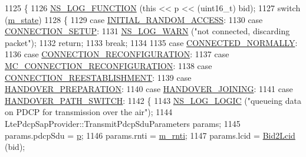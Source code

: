 \begin{DoxyCode}
1125 \{
1126   \hyperlink{log-macros-disabled_8h_a90b90d5bad1f39cb1b64923ea94c0761}{NS\_LOG\_FUNCTION} (\textcolor{keyword}{this} << p << (uint16\_t) bid);
1127   \textcolor{keywordflow}{switch} (\hyperlink{classns3_1_1UeManager_aaed4b2490297cb912e743084f1a27b08}{m\_state})
1128     \{
1129     \textcolor{keywordflow}{case} \hyperlink{classns3_1_1UeManager_a2f4085fdd18d7125c27da44a5b8b6808a6e92e7eaed87665e012ff9c3a4a9e4d3}{INITIAL\_RANDOM\_ACCESS}:
1130     \textcolor{keywordflow}{case} \hyperlink{classns3_1_1UeManager_a2f4085fdd18d7125c27da44a5b8b6808a54b5e529e9da2b99970d8939dbd9832e}{CONNECTION\_SETUP}:
1131       \hyperlink{group__logging_gade7208b4009cdf0e25783cd26766f559}{NS\_LOG\_WARN} (\textcolor{stringliteral}{"not connected, discarding packet"});
1132       \textcolor{keywordflow}{return};
1133       \textcolor{keywordflow}{break};
1134 
1135     \textcolor{keywordflow}{case} \hyperlink{classns3_1_1UeManager_a2f4085fdd18d7125c27da44a5b8b6808a2a1020dce30f19aa9354ba34b2e7c5e0}{CONNECTED\_NORMALLY}:
1136     \textcolor{keywordflow}{case} \hyperlink{classns3_1_1UeManager_a2f4085fdd18d7125c27da44a5b8b6808abd13cee86acc2cb3c04241dec919c73f}{CONNECTION\_RECONFIGURATION}:
1137     \textcolor{keywordflow}{case} \hyperlink{classns3_1_1UeManager_a2f4085fdd18d7125c27da44a5b8b6808a263ff177d041c66b6a07b69e2be5562e}{MC\_CONNECTION\_RECONFIGURATION}:
1138     \textcolor{keywordflow}{case} \hyperlink{classns3_1_1UeManager_a2f4085fdd18d7125c27da44a5b8b6808a2e74c6adfadd2e6826deb4fec7e94520}{CONNECTION\_REESTABLISHMENT}:
1139     \textcolor{keywordflow}{case} \hyperlink{classns3_1_1UeManager_a2f4085fdd18d7125c27da44a5b8b6808af12d34cff237916f8322a4b1031ceeda}{HANDOVER\_PREPARATION}:
1140     \textcolor{keywordflow}{case} \hyperlink{classns3_1_1UeManager_a2f4085fdd18d7125c27da44a5b8b6808a093669f7255c35aa11645ba004a896ea}{HANDOVER\_JOINING}:
1141     \textcolor{keywordflow}{case} \hyperlink{classns3_1_1UeManager_a2f4085fdd18d7125c27da44a5b8b6808a66ee8994a912a463763b439ac0f158f2}{HANDOVER\_PATH\_SWITCH}:
1142       \{
1143         \hyperlink{group__logging_ga88acd260151caf2db9c0fc84997f45ce}{NS\_LOG\_LOGIC} (\textcolor{stringliteral}{"queueing data on PDCP for transmission over the air"});
1144         LtePdcpSapProvider::TransmitPdcpSduParameters params;
1145         params.pdcpSdu = \hyperlink{lte__link__budget_8m_ac9de518908a968428863f829398a4e62}{p};
1146         params.rnti = \hyperlink{classns3_1_1UeManager_a5a72b4fe818f21993bd7f05d7e2c4f83}{m\_rnti};
1147         params.lcid = \hyperlink{classns3_1_1UeManager_a5f3f8e891803bc57dc35af2c6c5a286d}{Bid2Lcid} (bid);

\end{DoxyCode}
